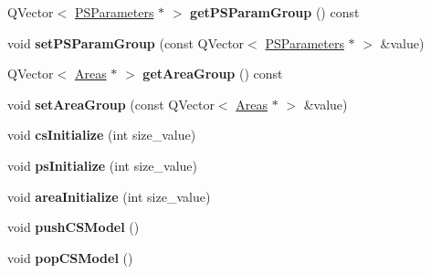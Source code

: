 \begin{DoxyCompactItemize}
\item 
Q\+Vector$<$ \hyperlink{struct_tuningtraffic_1_1_p_s_parameters}{P\+S\+Parameters} $\ast$ $>$ {\bfseries get\+P\+S\+Param\+Group} () const \hypertarget{class_tuningtraffic_a27bd25761858263b0041eade27d0c2fe}{}\label{class_tuningtraffic_a27bd25761858263b0041eade27d0c2fe}

\item 
void {\bfseries set\+P\+S\+Param\+Group} (const Q\+Vector$<$ \hyperlink{struct_tuningtraffic_1_1_p_s_parameters}{P\+S\+Parameters} $\ast$ $>$ \&value)\hypertarget{class_tuningtraffic_a17263c722208429ead159270e4dfd6eb}{}\label{class_tuningtraffic_a17263c722208429ead159270e4dfd6eb}

\item 
Q\+Vector$<$ \hyperlink{struct_tuningtraffic_1_1_areas}{Areas} $\ast$ $>$ {\bfseries get\+Area\+Group} () const \hypertarget{class_tuningtraffic_ab35c026fdb1acc106c0bb02323d0fda4}{}\label{class_tuningtraffic_ab35c026fdb1acc106c0bb02323d0fda4}

\item 
void {\bfseries set\+Area\+Group} (const Q\+Vector$<$ \hyperlink{struct_tuningtraffic_1_1_areas}{Areas} $\ast$ $>$ \&value)\hypertarget{class_tuningtraffic_a932a6f2efcf3ac204cb8f841c09a2ecc}{}\label{class_tuningtraffic_a932a6f2efcf3ac204cb8f841c09a2ecc}

\item 
void {\bfseries cs\+Initialize} (int size\+\_\+value)\hypertarget{class_tuningtraffic_a48233b11efbad9c756fe603dc8ca167c}{}\label{class_tuningtraffic_a48233b11efbad9c756fe603dc8ca167c}

\item 
void {\bfseries ps\+Initialize} (int size\+\_\+value)\hypertarget{class_tuningtraffic_a6fb7cdf3a94a500a984f9539835ab953}{}\label{class_tuningtraffic_a6fb7cdf3a94a500a984f9539835ab953}

\item 
void {\bfseries area\+Initialize} (int size\+\_\+value)\hypertarget{class_tuningtraffic_a7d6a83a0f5e0c6c1b21f7c99afb52878}{}\label{class_tuningtraffic_a7d6a83a0f5e0c6c1b21f7c99afb52878}

\item 
void {\bfseries push\+C\+S\+Model} ()\hypertarget{class_tuningtraffic_a82082e717ecf756cff07083790133b35}{}\label{class_tuningtraffic_a82082e717ecf756cff07083790133b35}

\item 
void {\bfseries pop\+C\+S\+Model} ()\hypertarget{class_tuningtraffic_a0a2f9fda29ea29083280d2de6c8b7066}{}\label{class_tuningtraffic_a0a2f9fda29ea29083280d2de6c8b7066}


\end{DoxyCompactItemize}
